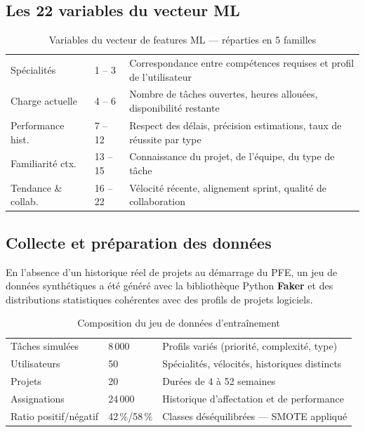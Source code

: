 \subsection{Les 22 variables du vecteur ML}

\begin{table}[H]
  \centering
  \caption{Variables du vecteur de features ML — réparties en 5 familles}
  \label{tab:features_ml}
  \begin{tabularx}{\textwidth}{C{1.5cm}L{3cm}X}
    \toprule
     &  &  \\
    \midrule
    Spécialités      & 1 -- 3  & Correspondance entre compétences requises et profil de l'utilisateur \\
    Charge actuelle  & 4 -- 6  & Nombre de tâches ouvertes, heures allouées, disponibilité restante \\
    Performance hist. & 7 -- 12 & Respect des délais, précision estimations, taux de réussite par type \\
    Familiarité ctx. & 13 -- 15 & Connaissance du projet, de l'équipe, du type de tâche \\
    Tendance \& collab. & 16 -- 22 & Vélocité récente, alignement sprint, qualité de collaboration \\
    \bottomrule
  \end{tabularx}
\end{table}

\subsection{Collecte et préparation des données}

En l'absence d'un historique réel de projets au démarrage du PFE, un jeu de données
synthétiques a été généré avec la bibliothèque Python \textbf{Faker} et des
distributions statistiques cohérentes avec des profils de projets logiciels.

\begin{table}[H]
  \centering
  \caption{Composition du jeu de données d'entraînement}
  \label{tab:dataset_ml}
  \begin{tabularx}{\textwidth}{L{5cm}C{3cm}X}
    \toprule
     &  &  \\
    \midrule
    Tâches simulées    & 8\,000      & Profils variés (priorité, complexité, type) \\
    Utilisateurs       & 50          & Spécialités, vélocités, historiques distincts \\
    Projets            & 20          & Durées de 4 à 52 semaines \\
    Assignations       & 24\,000     & Historique d'affectation et de performance \\
    Ratio positif/négatif & 42\,\%/58\,\% & Classes déséquilibrées — SMOTE appliqué \\
    \bottomrule
  \end{tabularx}
\end{table}


